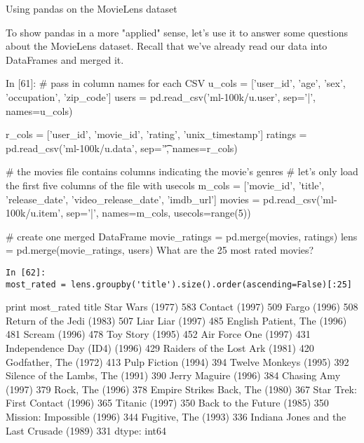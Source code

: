 




Using pandas on the MovieLens dataset

To show pandas in a more "applied" sense, let's use it to answer some questions about the MovieLens dataset. Recall that we've already read our data into DataFrames and merged it.

In [61]:
# pass in column names for each CSV
u_cols = ['user_id', 'age', 'sex', 'occupation', 'zip_code']
users = pd.read_csv('ml-100k/u.user', sep='|', names=u_cols)

r_cols = ['user_id', 'movie_id', 'rating', 'unix_timestamp']
ratings = pd.read_csv('ml-100k/u.data', sep='\t', names=r_cols)

# the movies file contains columns indicating the movie's genres
# let's only load the first five columns of the file with usecols
m_cols = ['movie_id', 'title', 'release_date', 'video_release_date', 'imdb_url']
movies = pd.read_csv('ml-100k/u.item', sep='|', names=m_cols, usecols=range(5))

# create one merged DataFrame
movie_ratings = pd.merge(movies, ratings)
lens = pd.merge(movie_ratings, users)
What are the 25 most rated movies?

\begin{verbatim}
In [62]:
most_rated = lens.groupby('title').size().order(ascending=False)[:25]
\end{verbatim}
print most_rated
title
Star Wars (1977)                             583
Contact (1997)                               509
Fargo (1996)                                 508
Return of the Jedi (1983)                    507
Liar Liar (1997)                             485
English Patient, The (1996)                  481
Scream (1996)                                478
Toy Story (1995)                             452
Air Force One (1997)                         431
Independence Day (ID4) (1996)                429
Raiders of the Lost Ark (1981)               420
Godfather, The (1972)                        413
Pulp Fiction (1994)                          394
Twelve Monkeys (1995)                        392
Silence of the Lambs, The (1991)             390
Jerry Maguire (1996)                         384
Chasing Amy (1997)                           379
Rock, The (1996)                             378
Empire Strikes Back, The (1980)              367
Star Trek: First Contact (1996)              365
Titanic (1997)                               350
Back to the Future (1985)                    350
Mission: Impossible (1996)                   344
Fugitive, The (1993)                         336
Indiana Jones and the Last Crusade (1989)    331
dtype: int64

